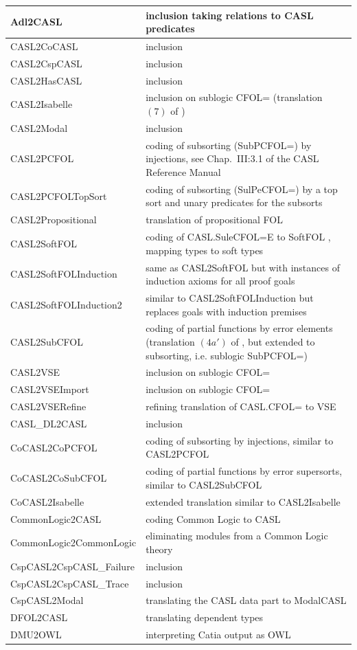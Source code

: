 \documentclass{article}
\begin{document}
\begin{tabular}{|l|p{8cm}|}\hline
Adl2CASL & inclusion taking relations to CASL predicates \\\hline
CASL2CoCASL & inclusion \\\hline
CASL2CspCASL & inclusion \\\hline
CASL2HasCASL & inclusion \\\hline
CASL2Isabelle & inclusion on sublogic CFOL=
(translation $(7)$ of \cite{Mossakowski02}) \\\hline
CASL2Modal & inclusion \\\hline
CASL2PCFOL & coding of subsorting (SubPCFOL=) by injections, see Chap.\ III:3.1 of the CASL Reference Manual \cite{CASL/RefManual} \\\hline
CASL2PCFOLTopSort & coding of subsorting (SulPeCFOL=) by a top sort and unary
predicates for the subsorts \\\hline
CASL2Propositional & translation of propositional FOL \\\hline
CASL2SoftFOL & coding of CASL.SuleCFOL=E to SoftFOL \cite{LuettichEA06a},
mapping types to soft types \\\hline
CASL2SoftFOLInduction & same as CASL2SoftFOL but with instances of induction
axioms for all proof goals \\\hline
CASL2SoftFOLInduction2 & similar to CASL2SoftFOLInduction but replaces goals with induction premises \\\hline
CASL2SubCFOL & coding of partial functions by error elements
(translation $(4a')$ of \cite{Mossakowski02}, but extended to subsorting, i.e. sublogic SubPCFOL=) \\\hline
CASL2VSE & inclusion on sublogic CFOL= \\\hline
CASL2VSEImport & inclusion on sublogic CFOL= \\\hline
CASL2VSERefine & refining translation of CASL.CFOL= to VSE \\\hline
CASL\_DL2CASL & inclusion \\\hline
CoCASL2CoPCFOL & coding of subsorting by injections, similar to CASL2PCFOL \\\hline
CoCASL2CoSubCFOL & coding of partial functions by error supersorts, similar to  CASL2SubCFOL \\\hline
CoCASL2Isabelle & extended translation similar to CASL2Isabelle \\\hline
CommonLogic2CASL & coding Common Logic to CASL \\\hline
CommonLogic2CommonLogic & eliminating modules from a Common Logic theory \\\hline
CspCASL2CspCASL\_Failure & inclusion \\\hline
CspCASL2CspCASL\_Trace & inclusion \\\hline
CspCASL2Modal & translating the CASL data part to ModalCASL \\\hline
DFOL2CASL & translating dependent types \\\hline
DMU2OWL & interpreting Catia output as OWL \\\hline
\end{tabular}
\end{document}
